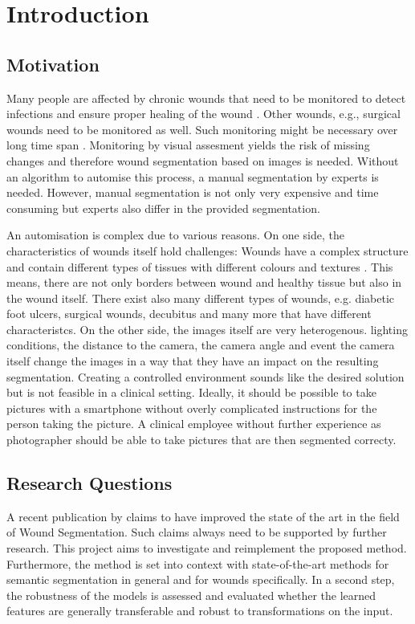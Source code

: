 \section{Introduction}

\subsection{Motivation}

Many people are affected by chronic wounds that need to be monitored to detect infections and ensure proper healing of the wound \cite{DFUC2022}. Other wounds, e.g., surgical wounds need to be monitored as well. Such monitoring might be necessary over long time span \cite{DFUC2022}. Monitoring by visual assesment yields the risk of missing changes and therefore wound segmentation based on images is needed. Without an algorithm to automise this process, a manual segmentation by experts is needed. However, manual segmentation is not only very expensive and time consuming but experts also differ in the provided segmentation.

An automisation is complex due to various reasons. On one side, the characteristics of wounds itself hold challenges: Wounds have a complex structure and contain different types of tissues with different colours and textures \cite{AhmadFauzi2015}. This means, there are not only borders between wound and healthy tissue but also in the wound itself. There exist also many different types of wounds, e.g. diabetic foot ulcers, surgical wounds, decubitus and many more that have different characteristcs. On the other side, the images itself are very heterogenous. lighting conditions, the distance to the camera, the camera angle and event the camera itself change the images in a way that they have an impact on the resulting segmentation. Creating a controlled environment sounds like the desired solution but is not feasible in a clinical setting. Ideally, it should be possible to take pictures with a smartphone without overly complicated instructions for the person taking the picture. A clinical employee without further experience as photographer should be able to take pictures that are then segmented correcty.

\subsection{Research Questions}

A recent publication by \citeauthor{Oota_2023_WACV} claims to have improved the state of the art in the field of Wound Segmentation. Such claims always need to be supported by further research. This project aims to investigate and reimplement the proposed method. Furthermore, the method is set into context with state-of-the-art methods for semantic segmentation in general and for wounds specifically. In a second step, the robustness of the models is assessed and evaluated whether the learned features are generally transferable and robust to transformations on the input.

